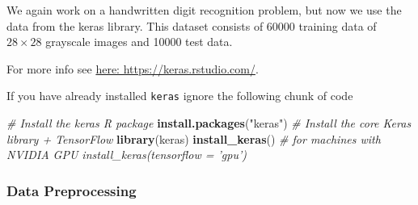 \documentclass[]{article}
\newenvironment{Shaded}{\begin{snugshade}}{\end{snugshade}}
\newcommand{\CommentTok}[1]{\textcolor[rgb]{0.56,0.35,0.01}{\textit{#1}}}
\newcommand{\DecValTok}[1]{\textcolor[rgb]{0.00,0.00,0.81}{#1}}
\newcommand{\KeywordTok}[1]{\textcolor[rgb]{0.13,0.29,0.53}{\textbf{#1}}}
\newcommand{\NormalTok}[1]{#1}
\newcommand{\OperatorTok}[1]{\textcolor[rgb]{0.81,0.36,0.00}{\textbf{#1}}}
\newcommand{\StringTok}[1]{\textcolor[rgb]{0.31,0.60,0.02}{#1}}
\begin{document}
We again work on a handwritten digit recognition problem, but now we use
the data from the keras library. This dataset consists of 60000 training
data of \(28\times28\) grayscale images and 10000 test data.

For more info see \href{https://keras.rstudio.com/}{here:
https://keras.rstudio.com/}.

If you have already installed \texttt{keras} ignore the following chunk
of code

\begin{Shaded}
\begin{Highlighting}[]
\CommentTok{# Install the keras R package}
\KeywordTok{install.packages}\NormalTok{(}\StringTok{"keras"}\NormalTok{)}
\CommentTok{# Install the core Keras library + TensorFlow}
\KeywordTok{library}\NormalTok{(keras)}
\KeywordTok{install_keras}\NormalTok{()}
\CommentTok{# for machines with NVIDIA GPU install_keras(tensorflow = 'gpu')}
\end{Highlighting}
\end{Shaded}

\hypertarget{data-preprocessing}{%
\subsubsection{Data Preprocessing}\label{data-preprocessing}}

\begin{Shaded}
\end{Shaded}
\end{document}

